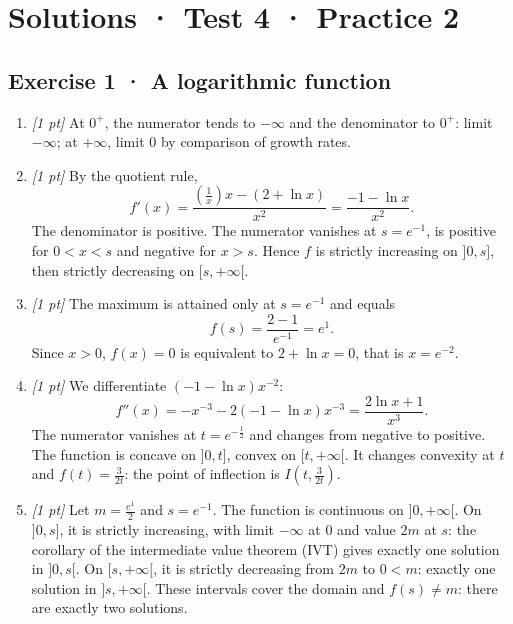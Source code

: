 \ifmxteacher\mxnewpage

\section*{Solutions · Test 4 · Practice 2}\label{cor:6-2}

\subsection*{Exercise 1 · A logarithmic function}\begin{enumerate}

\item \textit{[1 pt]} At $0^+$, the numerator tends to $-\infty$ and the denominator to $0^+$: limit $-\infty$; at $+\infty$, limit $0$ by comparison of growth rates.

\item \textit{[1 pt]} By the quotient rule,
\[f'(x)=\frac{(\frac{1}{x})x-(2+\ln x)}{x^2}=\frac{-1-\ln x}{x^2}.\]
The denominator is positive. The numerator vanishes at $s=e^{-1}$, is positive for $0<x<s$ and negative for $x>s$. Hence $f$ is strictly increasing on $]0,s]$, then strictly decreasing on $[s,+\infty[$.

\item \textit{[1 pt]} The maximum is attained only at $s=e^{-1}$ and equals
\[f(s)=\frac{2- 1}{e^{-1}}=e^{1}.\]
Since $x>0$, $f(x)=0$ is equivalent to $2+\ln x=0$, that is $x=e^{-2}$.

\item \textit{[1 pt]} We differentiate $(-1-\ln x)x^{-2}$:
\[f''(x)=-x^{-3}-2(-1-\ln x)x^{-3}=\frac{2\ln x+1}{x^3}.\]
The numerator vanishes at $t=e^{-\frac{1}{2}}$ and changes from negative to positive. The function is concave on $]0,t]$, convex on $[t,+\infty[$. It changes convexity at $t$ and $f(t)=\frac{3}{2t}$: the point of inflection is $I(t,\frac{3}{2t})$.

\item \textit{[1 pt]} Let $m=\frac{e^{1}}{2}$ and $s=e^{-1}$. The function is continuous on $]0,+\infty[$. On $]0,s]$, it is strictly increasing, with limit $-\infty$ at $0$ and value $2m$ at $s$: the corollary of the intermediate value theorem (IVT) gives exactly one solution in $]0,s[$. On $[s,+\infty[$, it is strictly decreasing from $2m$ to $0<m$: exactly one solution in $]s,+\infty[$. These intervals cover the domain and $f(s)\ne m$: there are exactly two solutions.

\end{enumerate}


